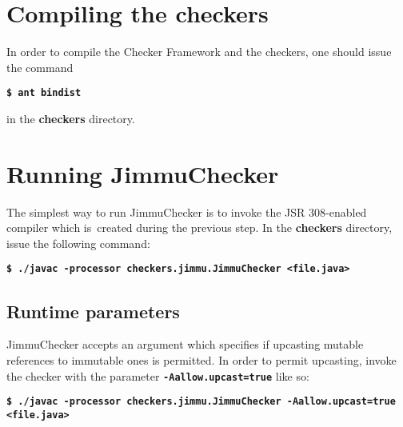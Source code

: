 \documentclass{pracamgr}
\theoremstyle{break}
\theoremstyle{break}
\theoremstyle{break}
\begin{document}
\section{Compiling the checkers}
\label{sec:compiling}

In order to compile the Checker Framework and the checkers, one should
issue the command

\indent \textbf{\texttt{\$ ant bindist}}

\noindent in the \textbf{checkers} directory. 

\section{Running JimmuChecker}

The simplest way to run JimmuChecker is to invoke the JSR 308-enabled
compiler which is~created during the previous step. In the
\textbf{checkers} directory, issue the following command:

\indent \textbf{\texttt{\$ ./javac -processor checkers.jimmu.JimmuChecker <file.java>}}

\subsection{Runtime parameters}

JimmuChecker accepts an argument which specifies if upcasting mutable
references to immutable ones is permitted. In order to permit
upcasting, invoke the checker with the parameter
\textbf{\texttt{-Aallow.upcast=true}} like so:

\indent \textbf{\texttt{\small{\$ ./javac -processor checkers.jimmu.JimmuChecker -Aallow.upcast=true <file.java>}}}

{}

\end{document}
